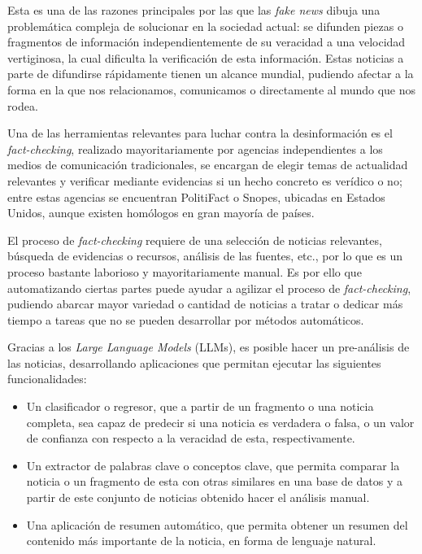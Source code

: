 Esta es una de las razones principales por las que las \emph{fake news} dibuja una problemática compleja de solucionar en la sociedad actual: se difunden piezas o fragmentos de información independientemente de su veracidad a una velocidad vertiginosa, la cual dificulta la verificación de esta información. Estas noticias a parte de difundirse rápidamente tienen un alcance mundial, pudiendo afectar a la forma en la que nos relacionamos, comunicamos o directamente al mundo que nos rodea.

Una de las herramientas relevantes para luchar contra la desinformación es el \emph{fact-checking}, realizado mayoritariamente por agencias independientes a los medios de comunicación tradicionales, se encargan de elegir temas de actualidad relevantes y verificar mediante evidencias si un hecho concreto es verídico o no; entre estas agencias se encuentran PolitiFact o Snopes, ubicadas en Estados Unidos, aunque existen homólogos en gran mayoría de países.

El proceso de \emph{fact-checking} requiere de una selección de noticias relevantes, búsqueda de evidencias o recursos, análisis de las fuentes, etc., por lo que es un proceso bastante laborioso y mayoritariamente manual. Es por ello que automatizando ciertas partes puede ayudar a agilizar el proceso de \emph{fact-checking}, pudiendo abarcar mayor variedad o cantidad de noticias a tratar o dedicar más tiempo a tareas que no se pueden desarrollar por métodos automáticos.

Gracias a los \emph{Large Language Models} (LLMs), es posible hacer un pre-análisis de las noticias, desarrollando aplicaciones que permitan ejecutar las siguientes funcionalidades:
\begin{itemize}
    \item Un clasificador o regresor, que a partir de un fragmento o una noticia completa, sea capaz de predecir si una noticia es verdadera o falsa, o un valor de confianza con respecto a la veracidad de esta, respectivamente.
    \item Un extractor de palabras clave o conceptos clave, que permita comparar la noticia o un fragmento de esta con otras similares en una base de datos y a partir de este conjunto de noticias obtenido hacer el análisis manual.
    \item Una aplicación de resumen automático, que permita obtener un resumen del contenido más importante de la noticia, en forma de lenguaje natural.
\end{itemize}

